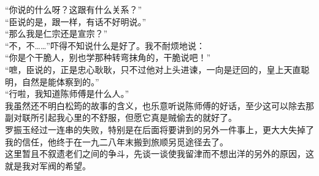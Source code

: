 “你说的什么呀？这跟有什么关系？”\\

“臣说的是，跟一样，有话不好明说。”\\

“那么我是仁宗还是宣宗？”\\

“不，不……”吓得不知说什么是好了。我不耐烦地说：\\

“你是个干脆人，别也学那种转弯抹角的，干脆说吧！”\\

“嗻，臣说的，正是忠心耿耿，只不过他对上头进谏，一向是迂回的，皇上天直聪明，自然是能体察到的。”\\

“行啦，我知道陈师傅是什么人。”\\

我虽然还不明白松筠的故事的含义，也乐意听说陈师傅的好话，至少这可以除去那副对联所引起我心里的不舒服，但愿它真是贼偷去的就好了。\\

罗振玉经过一连串的失败，特别是在后面将要讲到的另外一件事上，更大大失掉了我的信任，他终于在一九二八年末搬到旅顺另觅途径去了。\\

这里暂且不叙遗老们之间的争斗，先谈一谈使我留津而不想出洋的另外的原因，这就是我对军阀的希望。
